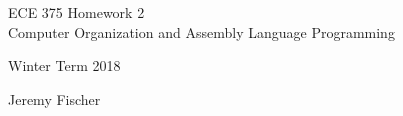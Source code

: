 \documentclass[12pt,letterpaper]{article}
\begin{document}
\begin{titlepage}
    \vspace*{4cm}
    \begin{flushright}
    {\huge
        ECE 375 Homework 2\\[1cm]
    }
    {\large
       Computer Organization and Assembly Language Programming
    }
    \end{flushright}
    \begin{flushleft}
    Winter Term 2018
    \end{flushleft}
    \begin{flushright}
    Jeremy Fischer

    \end{flushright}

\end{titlepage}
\end{document}
